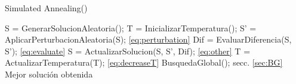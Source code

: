 \begin{algorithm}[!ht]
  \caption{Simulated Annealing(\mbox{})}
  \label{pseu:sa}
  \begin{algorithmic}[1]
    \STATE S = GenerarSolucionAleatoria();
    \STATE T = InicializarTemperatura(); 
        \STATE S' = AplicarPerturbacionAleatoria(S); \ref{eq:perturbation}
        \STATE Dif = EvaluarDiferencia(S, S'); \ref{eq:evaluate} 
        \STATE S = ActualizarSolucion(S, S', Dif);  \ref{eq:other}
        \STATE T = ActualizarTemperatura(T); \ref{eq:decreaseT}
        \STATE BusquedaGlobal(); secc. \ref{sec:BG}
    \ENDWHILE
    \RETURN Mejor solución obtenida
  \end{algorithmic}
\end{algorithm}